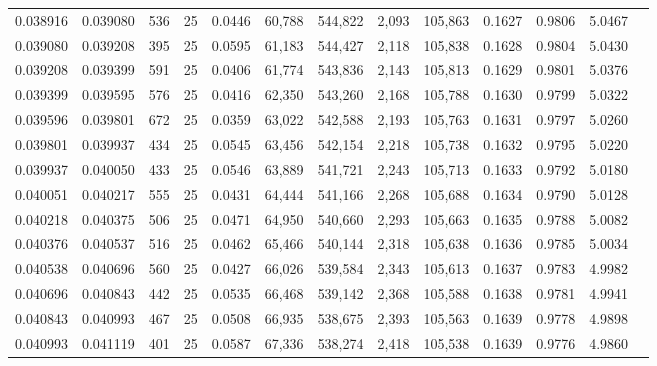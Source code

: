 \begin{tabular}{rrrrrrrrrrrrr}
0.038916 & 0.039080 &   536 &  25 &                                     0.0446 &  60,788 & 544,822 &   2,093 & 105,863 & 0.1627 & 0.9806 & 5.0467 \\
0.039080 & 0.039208 &   395 &  25 &                                     0.0595 &  61,183 & 544,427 &   2,118 & 105,838 & 0.1628 & 0.9804 & 5.0430 \\
0.039208 & 0.039399 &   591 &  25 &                                     0.0406 &  61,774 & 543,836 &   2,143 & 105,813 & 0.1629 & 0.9801 & 5.0376 \\
0.039399 & 0.039595 &   576 &  25 &                                     0.0416 &  62,350 & 543,260 &   2,168 & 105,788 & 0.1630 & 0.9799 & 5.0322 \\
0.039596 & 0.039801 &   672 &  25 &                                     0.0359 &  63,022 & 542,588 &   2,193 & 105,763 & 0.1631 & 0.9797 & 5.0260 \\
0.039801 & 0.039937 &   434 &  25 &                                     0.0545 &  63,456 & 542,154 &   2,218 & 105,738 & 0.1632 & 0.9795 & 5.0220 \\
0.039937 & 0.040050 &   433 &  25 &                                     0.0546 &  63,889 & 541,721 &   2,243 & 105,713 & 0.1633 & 0.9792 & 5.0180 \\
0.040051 & 0.040217 &   555 &  25 &                                     0.0431 &  64,444 & 541,166 &   2,268 & 105,688 & 0.1634 & 0.9790 & 5.0128 \\
0.040218 & 0.040375 &   506 &  25 &                                     0.0471 &  64,950 & 540,660 &   2,293 & 105,663 & 0.1635 & 0.9788 & 5.0082 \\
0.040376 & 0.040537 &   516 &  25 &                                     0.0462 &  65,466 & 540,144 &   2,318 & 105,638 & 0.1636 & 0.9785 & 5.0034 \\
0.040538 & 0.040696 &   560 &  25 &                                     0.0427 &  66,026 & 539,584 &   2,343 & 105,613 & 0.1637 & 0.9783 & 4.9982 \\
0.040696 & 0.040843 &   442 &  25 &                                     0.0535 &  66,468 & 539,142 &   2,368 & 105,588 & 0.1638 & 0.9781 & 4.9941 \\
0.040843 & 0.040993 &   467 &  25 &                                     0.0508 &  66,935 & 538,675 &   2,393 & 105,563 & 0.1639 & 0.9778 & 4.9898 \\
0.040993 & 0.041119 &   401 &  25 &                                     0.0587 &  67,336 & 538,274 &   2,418 & 105,538 & 0.1639 & 0.9776 & 4.9860 \\

\end{tabular}
